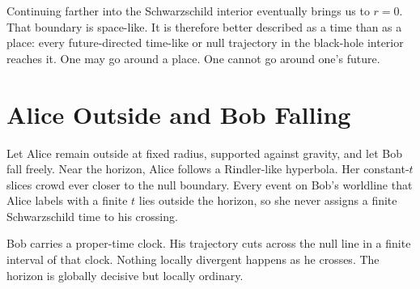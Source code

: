 Continuing farther into the Schwarzschild interior eventually brings us to
\(r=0\).  That boundary is space-like.  It is therefore better described as a
time than as a place: every future-directed time-like or null trajectory in
the black-hole interior reaches it.  One may go around a place.  One cannot go
around one's future.

\begin{classroomqa}
\end{classroomqa}

\begin{classroomqa}
\end{classroomqa}

\section{Alice Outside and Bob Falling}

Let Alice remain outside at fixed radius, supported against gravity, and let
Bob fall freely.  Near the horizon, Alice follows a Rindler-like hyperbola.
Her constant-\(t\) slices crowd ever closer to the null boundary.  Every event
on Bob's worldline that Alice labels with a finite \(t\) lies outside the
horizon, so she never assigns a finite Schwarzschild time to his crossing.

Bob carries a proper-time clock.  His trajectory cuts across the null line in
a finite interval of that clock.  Nothing locally divergent happens as he
crosses.  The horizon is globally decisive but locally ordinary.

